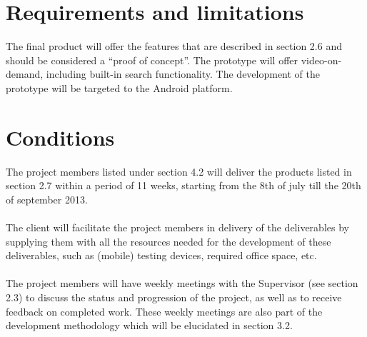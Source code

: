 \section{Requirements and limitations}
The final product will offer the features that are described in section 2.6 and should be considered a ``proof of concept''. The prototype will offer video-on-demand, including built-in search functionality. The development of the prototype will be targeted to the Android platform. 
\section{Conditions}
The project members listed under section 4.2 will deliver the products listed in section 2.7 within a period of 11 weeks, starting from the 8th of july till the 20th of september 2013.\\
\\
The client will facilitate the project members in delivery of the deliverables by supplying them with all the resources needed for the development of these deliverables, such as (mobile) testing devices, required office space, etc.\\
\\
The project members will have weekly meetings with the Supervisor (see section 2.3) to discuss the status and progression of the project, as well as to receive feedback on completed work. These weekly meetings are also part of the development methodology which will be elucidated in section 3.2.